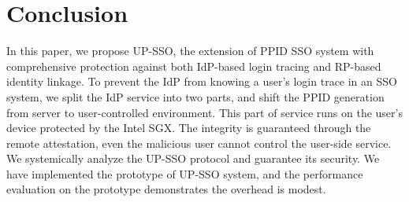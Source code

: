 \section{Conclusion}
\label{sec:conclusion}
In this paper, we propose UP-SSO, 
the extension of PPID SSO system with comprehensive protection against both IdP-based login tracing and RP-based identity linkage. To prevent the IdP from knowing a user's login trace in an SSO system, we split the IdP service into two parts, and shift the PPID generation from server to user-controlled environment.
This part of service runs on the user's device protected by the Intel SGX. The integrity is guaranteed through the remote attestation, even the malicious user cannot control the user-side service. 
We systemically analyze the UP-SSO protocol and guarantee its security. 
We have implemented the prototype of UP-SSO system, and the performance evaluation on the prototype demonstrates the  overhead is modest. 